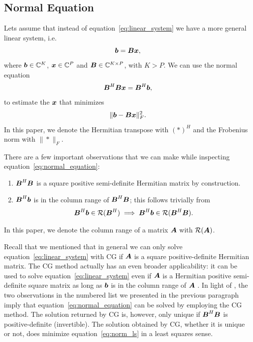 \documentclass[useAMS,usenatbib]{mn2e}
\newcommand{\bA}{\bmath{A}}
\newcommand{\bB}{\bmath{B}}
\newcommand{\bb}{\bmath{b}}
\newcommand{\bx}{\bmath{x}}
\begin{document}
\subsection{Normal Equation}
\label{sec:normal}
Lets assume that instead of equation~\ref{eq:linear_system} we have a more general linear system, i.e.
\begin{equation}
 \bb = \bB\bx,
\end{equation}
where $\bb\in\mathbb{C}^K$, $\bx\in\mathbb{C}^P$  and $\bB\in\mathbb{C}^{K \times P}$, with $K > P$. We can use the normal equation 
\begin{equation}
\label{eq:normal_equation}
\bB^H\bB\bx = \bB^H\bb, 
\end{equation}
to estimate the $\bx$ that minimizes
\begin{equation}
\label{eq:norm_ls}
\|\bb-\bB\bx\|_F^2. 
\end{equation}
In this paper, we denote the Hermitian transpose with $(*)^H$ and the Frobenius norm with $\|*\|_F$.

There are a few important observations that we can make while inspecting equation~\ref{eq:normal_equation}:
\begin{enumerate}
\item $\bB^H\bB$ is a square positive semi-definite Hermitian matrix by construction.
\item $\bB^H\bb$ is in the column range of $\bB^H\bB$; this follows trivially from 
\begin{equation}
\bB^H\bb \in \mathcal{R}(\bB^H) \implies \bB^H\bb \in \mathcal{R}(\bB^H\bB).   
\end{equation}
\end{enumerate}
In this paper, we denote the column range of a matrix $\bA$ with $\mathcal{R}(\bA)$.

Recall that we mentioned that in general we can only solve equation~\ref{eq:linear_system} with CG if $\bA$ is a square positive-definite Hermitian matrix. The CG method actually has an even broader applicability: it can be used to solve equation~\ref{eq:linear_system} even if $\bA$ is a Hermitian positive semi-definite
square matrix as long as $\bb$ is in the column range of $\bA$ \citep{Lu2015}. In light of \citet{Lu2015}, the two observations in the numbered list we presented in the previous paragraph imply that equation~\ref{eq:normal_equation}
can be solved by employing the CG method. The solution returned by CG is, however, only unique if $\bB^H\bB$ is positive-definite (invertible). The solution
obtained by CG, whether it is unique or not, does minimize equation~\ref{eq:norm_ls} in a least squares sense.
\end{document}
